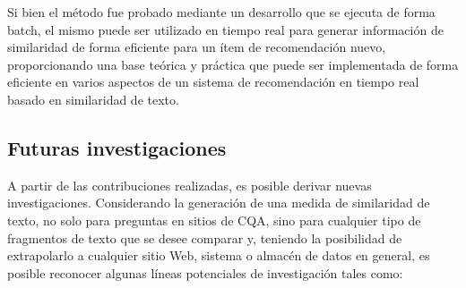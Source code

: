 \bigskip Si bien el método fue probado mediante un desarrollo que se ejecuta de forma batch, el mismo puede ser utilizado en tiempo real para generar información de similaridad de forma eficiente para un ítem de recomendación nuevo,  proporcionando una base teórica y práctica que puede ser implementada de forma eficiente en varios aspectos de un sistema de recomendación en tiempo real basado en similaridad de texto.

\subsection{Futuras investigaciones}
A partir de las contribuciones realizadas, es posible derivar nuevas investigaciones. Considerando la generación de una medida de similaridad de texto, no solo para preguntas en sitios de CQA, sino para cualquier tipo de fragmentos de texto que se desee comparar y, teniendo la posibilidad de extrapolarlo a cualquier sitio Web, sistema o almacén de datos en general, es posible reconocer algunas líneas potenciales de investigación tales como:
